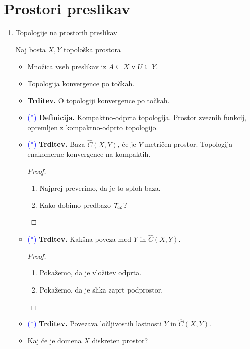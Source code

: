 \section{Prostori preslikav}

\begin{enumerate}
    \item Topologije na prostorih preslikav
    
    Naj bosta \(X, Y\) topološka prostora
    \begin{itemize}
        \item Množica vseh preslikav iz \(A \subseteq X\) v \(U \subseteq Y\).
        \item Topologija konvergence po točkah.
        \item \textbf{Trditev.} O topologiji konvergence po točkah.
        \item \textcolor{blue}{(*)}  \textbf{Definicija.} Kompaktno-odprta topologija. Prostor zveznih funkcij, opremljen z kompaktno-odprto topologijo.
        \item \textcolor{blue}{(*)} \textbf{Trditev.} Baza \(\widehat{C}(X, Y)\), če je \(Y\) metričen prostor. Topologija enakomerne konvergence na kompaktih.
        \begin{proof} \
            \begin{enumerate}
                \item Najprej preverimo, da je to sploh baza.
                \item Kako dobimo predbazo \(\mathcal{T}_{co}\)? \qedhere
            \end{enumerate}
        \end{proof}
        \item \textcolor{blue}{(*)} \textbf{Trditev.} Kakšna poveza med \(Y\) in \(\widehat{C}(X, Y)\).
        \begin{proof}
            \begin{enumerate}
                \item Pokažemo, da je vložitev odprta.
                \item Pokažemo, da je slika zaprt podprostor. \qedhere
            \end{enumerate}
        \end{proof}
        \item \textcolor{blue}{(*)} \textbf{Trditev.} Povezava ločljivostih lastnosti \(Y\) in \(\widehat{C}(X, Y)\).
        \item Kaj če je domena \(X\) diskreten prostor?
    \end{itemize}


\end{enumerate}
